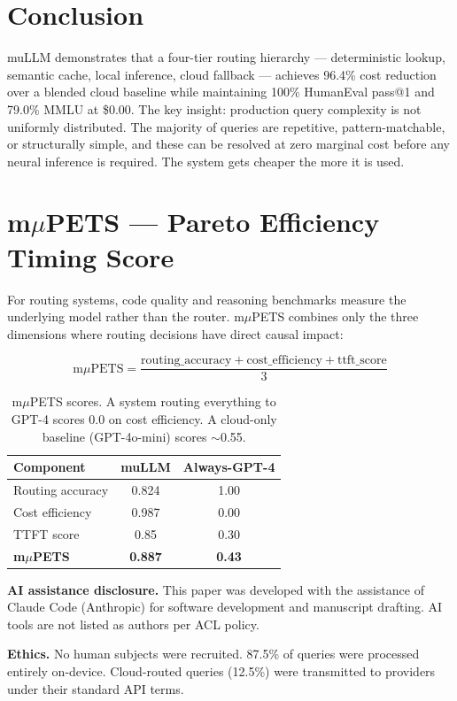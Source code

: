 \documentclass[11pt]{article}
\begin{document}
\section{Conclusion}

muLLM demonstrates that a four-tier routing hierarchy --- deterministic
lookup, semantic cache, local inference, cloud fallback --- achieves
96.4\% cost reduction over a blended cloud baseline while maintaining
100\% HumanEval pass@1 and 79.0\% MMLU at \$0.00. The key insight:
production query complexity is not uniformly distributed. The majority
of queries are repetitive, pattern-matchable, or structurally simple,
and these can be resolved at zero marginal cost before any neural
inference is required. The system gets cheaper the more it is used.




\appendix

\section{m$\mu$PETS --- Pareto Efficiency Timing Score}

For routing systems, code quality and reasoning benchmarks measure the
underlying model rather than the router. m$\mu$PETS combines only the
three dimensions where routing decisions have direct causal impact:

\[
\text{m}\mu\text{PETS} = \frac{\text{routing\_accuracy} + \text{cost\_efficiency} + \text{ttft\_score}}{3}
\]

\begin{table}[h]
\centering
\small
\begin{tabular}{lcc}
\toprule
\textbf{Component} & \textbf{muLLM} & \textbf{Always-GPT-4} \\
\midrule
Routing accuracy & 0.824 & 1.00 \\
Cost efficiency & 0.987 & 0.00 \\
TTFT score & 0.85 & 0.30 \\
\midrule
\textbf{m$\mu$PETS} & \textbf{0.887} & \textbf{0.43} \\
\bottomrule
\end{tabular}
\caption{m$\mu$PETS scores. A system routing everything to GPT-4 scores 0.0 on cost efficiency. A cloud-only baseline (GPT-4o-mini) scores $\sim$0.55.}
\label{tab:mpets}
\end{table}

\textbf{AI assistance disclosure.} This paper was developed with the
assistance of Claude Code (Anthropic) for software development and
manuscript drafting. AI tools are not listed as authors per ACL policy.

\textbf{Ethics.} No human subjects were recruited. 87.5\% of queries
were processed entirely on-device. Cloud-routed queries (12.5\%) were
transmitted to providers under their standard API terms.
\end{document}
